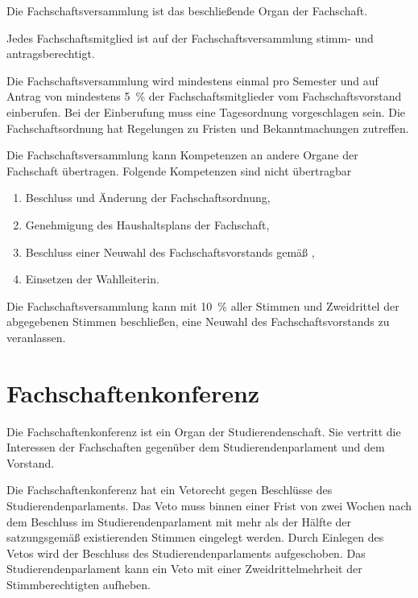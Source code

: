 \begin{contract}
\label{fachschaft:vv}

Die Fachschaftsversammlung ist das beschließende Organ der Fachschaft.

Jedes Fachschaftsmitglied ist auf der Fachschaftsversammlung stimm- und antragsberechtigt.

Die Fachschaftsversammlung wird mindestens einmal pro Semester und auf Antrag von mindestens 5~\% der Fach\-schaftsmitglieder vom Fachschaftsvorstand einberufen. Bei der Einberufung muss eine Tagesordnung vorgeschlagen sein. Die Fachschaftsordnung hat Regelungen zu Fristen und Bekanntmachungen zutreffen.

Die Fachschaftsversammlung kann Kompetenzen an andere Organe der Fachschaft übertragen. Folgende Kompetenzen sind nicht übertragbar \label{fachschaft:vv:kompetenzen}
  \begin{enumerate}
  \item Beschluss und Änderung der Fachschaftsordnung,
  \item Genehmigung des Haushaltsplans der Fachschaft,
  \item Beschluss einer Neuwahl des Fachschaftsvorstands gemäß , \label{fachschaft:vv:kompetenzen:abwahl}
  \item Einsetzen der Wahlleiterin.\label{fachschaft:vv:wahlleiter}
  \end{enumerate}

Die Fachschaftsversammlung kann mit 10~\% aller Stimmen und Zweidrittel der abgegebenen Stimmen be\-schlie\-ßen, eine Neuwahl des Fach\-schaftsvor\-stands zu veranlassen\label{fachschaft:vv:wahl}.

%
%

\parnumberfalse \section{Fachschaftenkonferenz}\label{fsk}  \parnumbertrue

 \label{fsk:aufgaben}

Die Fachschaftenkonferenz ist ein Organ der Studierendenschaft. Sie vertritt die Interessen der Fachschaften  gegenüber dem Studierendenparlament und dem Vorstand.

Die Fachschaftenkonferenz hat ein Vetorecht gegen Beschlüsse des Studierendenparlaments. Das Veto muss binnen einer Frist von zwei Wochen nach dem Beschluss im Studierendenparlament mit mehr als der Hälfte der satzungsgemäß existierenden Stimmen eingelegt werden. Durch Einlegen des Vetos wird der Beschluss des Studierendenparlaments aufgeschoben. Das Studierendenparlament kann ein Veto mit einer Zweidrittelmehrheit der Stimmberechtigten aufheben.\label{fsk:aufgaben:einspruch}


\end{contract}
